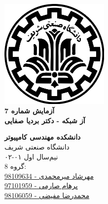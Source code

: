 \documentclass{article}
\begin{document}
\begin{titlepage}
	\begin{center}
		\vspace{0.2cm}
		
		\includegraphics[width=0.4\textwidth]{sharif.png}\\
		\vspace{0.2cm}
		\textbf{ \Huge{آزمایش شماره 7}}\\
		\vspace{0.25cm}
		\textbf{ \Large{آز شبکه - دکتر بردیا صفایی}}
		\vspace{0.2cm}
		
		
		\large \textbf{دانشکده مهندسی کامپیوتر}\\\vspace{0.1cm}
		\large   دانشگاه صنعتی شریف\\\vspace{0.2cm}
		\large   ﻧﯿﻢ‌سال اول ۰۱-۰۲ \\\vspace{0.10cm}
		\large{ گروه 8:}\\
		\large{\href{mailto:mehrshad.mirmohammadi@gmail.com}{مهرشاد میرمحمدی - 98109634}}\\
		\large{\href{mailto:parhaamsaremi@gmail.com}{پرهام صارمی - 97101959}}\\
		\large{\href{mailto:mofayezi.m@gmail.com}{محمدرضا مفیضی - 98106059}}\\
	\end{center}
\end{titlepage}

\newpage

\pagestyle{fancy}
\fancyhf{}
\fancyfoot{}
\setlength{\headheight}{59pt}
\cfoot{\thepage}
\end{document}
